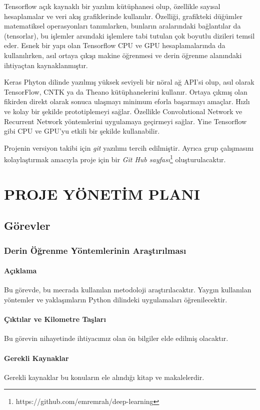 \documentclass[12pt,a4paper]{article}
\begin{document}
   Tensorflow açık kaynaklı bir yazılım kütüphanesi olup, özellikle sayısal hesaplamalar ve veri akış grafiklerinde kullanılır. Özelliği, grafikteki düğümler matematiksel operasyonları tanımlarken, bunların aralarındaki bağlantılar da (tensorlar), bu işlemler arsındaki işlemlere tabi tutulan çok boyutlu dizileri temsil eder.
   Esnek bir yapı olan Tensorflow CPU ve GPU hesaplamalarında da kullanılırken, asıl ortaya çıkışı makine öğrenmesi ve derin öğrenme alanındaki ihtiyaçtan kaynaklanmıştır. \cite{tf}

   Keras Phyton dilinde yazılmış yüksek seviyeli bir nöral ağ API'si olup, asıl olarak TensorFlow, CNTK ya da Theano kütüphanelerini kullanır. Ortaya çıkmış olan fikirden direkt olarak sonuca ulaşmayı minimum eforla başarmayı amaçlar. Hızlı ve kolay bir şekilde prototiplemeyi sağlar. Özellikle Convolutional Network ve Recurrent Network yöntemlerini uygulamaya geçirmeyi sağlar. Yine Tensorflow gibi CPU ve GPU'yu etkili bir şekilde kullanabilir. \cite{keras}
   
   Projenin versiyon takibi için \textit{git} yazılımı tercih edilmiştir. Ayrıca grup çalışmasını kolaylaştırmak amacıyla proje için bir \textit{Git Hub sayfası}\footnote{https://github.com/emremrah/deep-learning} oluşturulacaktır.

   \section{PROJE YÖNETİM PLANI}
   \subsection{Görevler}
   \subsubsection{Derin Öğrenme Yöntemlerinin Araştırılması}
   \paragraph{Açıklama}
   Bu görevde, bu mecrada kullanılan metodoloji araştırılacaktır. Yaygın kullanılan yöntemler ve yaklaşımların Python dilindeki uygulamaları öğrenilecektir.
   \paragraph{Çıktılar ve Kilometre Taşları}
   Bu görevin nihayetinde ihtiyacımız olan ön bilgiler elde edilmiş olacaktır.

   \paragraph{Gerekli Kaynaklar}
   Gerekli kaynaklar bu konuların ele alındığı kitap ve makalelerdir.
\end{document}

